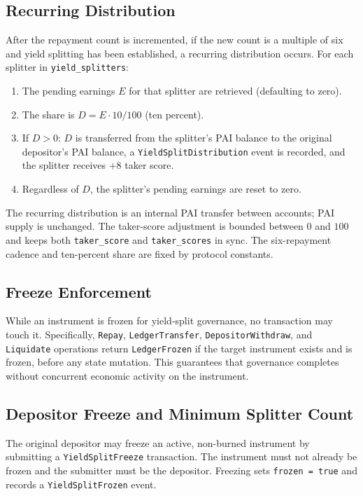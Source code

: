 \documentclass[11pt,a4paper]{article}
\begin{document}
\subsection{Recurring Distribution}
After the repayment count is incremented, if the new count is a multiple of six and yield splitting has been established, a recurring distribution occurs. For each splitter in \texttt{yield\_splitters}:
\begin{enumerate}
\item The pending earnings $E$ for that splitter are retrieved (defaulting to zero).
\item The share is $D = E \cdot 10 / 100$ (ten percent).
\item If $D > 0$: $D$ is transferred from the splitter's PAI balance to the original depositor's PAI balance, a \texttt{YieldSplitDistribution} event is recorded, and the splitter receives $+8$ taker score.
\item Regardless of $D$, the splitter's pending earnings are reset to zero.
\end{enumerate}
The recurring distribution is an internal PAI transfer between accounts; PAI supply is unchanged. The taker-score adjustment is bounded between $0$ and $100$ and keeps both \texttt{taker\_score} and \texttt{taker\_scores} in sync. The six-repayment cadence and ten-percent share are fixed by protocol constants.

\subsection{Freeze Enforcement}
While an instrument is frozen for yield-split governance, no transaction may touch it. Specifically, \texttt{Repay}, \texttt{LedgerTransfer}, \texttt{DepositorWithdraw}, and \texttt{Liquidate} operations return \texttt{LedgerFrozen} if the target instrument exists and is frozen, before any state mutation. This guarantees that governance completes without concurrent economic activity on the instrument.

\subsection{Depositor Freeze and Minimum Splitter Count}
The original depositor may freeze an active, non-burned instrument by submitting a \texttt{YieldSplitFreeze} transaction. The instrument must not already be frozen and the submitter must be the depositor. Freezing sets \texttt{frozen = true} and records a \texttt{YieldSplitFrozen} event.
\end{document}
